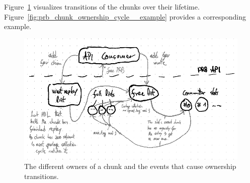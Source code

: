 \documentclass[12pt,a4paper,twoside]{book}
\begin{document}
Figure~\ref{fig:prb_chunk_ownership_cycle__transitions} visualizes transitions of the chunks over their lifetime.
Figure~\ref{fig:prb_chunk_ownership_cycle__example} provides a corresponding example.

\begin{figure}[H]
    \centering
    \includegraphics{fig/prb_chunk_ownership_cycle__transitions}
    \caption{The different owners of a chunk and the events that cause ownership transitions.}
    \label{fig:prb_chunk_ownership_cycle__transitions}
\end{figure}
\end{document}
